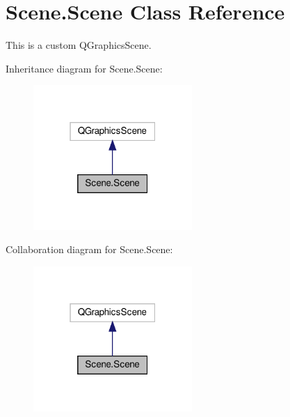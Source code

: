 \hypertarget{classScene_1_1Scene}{}\section{Scene.\+Scene Class Reference}
\label{classScene_1_1Scene}


This is a custom Q\+Graphics\+Scene.  




Inheritance diagram for Scene.\+Scene\+:\nopagebreak
\begin{figure}[H]
\begin{center}
\leavevmode
\includegraphics[width=171pt]{classScene_1_1Scene__inherit__graph}
\end{center}
\end{figure}


Collaboration diagram for Scene.\+Scene\+:\nopagebreak
\begin{figure}[H]
\begin{center}
\leavevmode
\includegraphics[width=171pt]{classScene_1_1Scene__coll__graph}
\end{center}
\end{figure}
